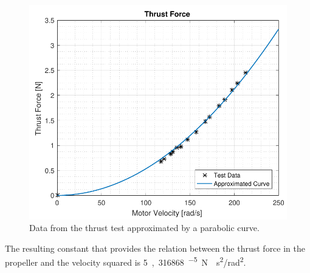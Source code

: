 \begin{figure}[H]
	\centering
	\includegraphics[scale=0.8]{figures/ThrustGraph}
	\caption{Data from the thrust test approximated by a parabolic curve.}
	\label{ThrustGraph}
\end{figure}

The resulting constant that provides the relation between the thrust force in the propeller and the velocity squared is \si{5,316868^{-5} N\cdot s^2/rad^2}.
